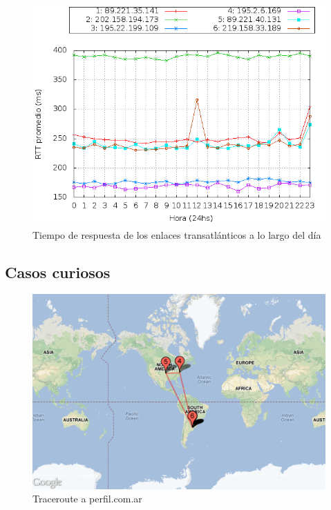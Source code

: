 \begin{figure}[H]
\begin{center}
\includegraphics[width=17cm]{rtts.png}
\end{center}
\caption{Tiempo de respuesta de los enlaces transatlánticos a lo largo del día} \label{figura1}
\end{figure}

\subsection{Casos curiosos}

\begin{figure}[H]
\begin{center}
\includegraphics[width=17cm]{perfil.png}
\end{center}
\caption{Traceroute a perfil.com.ar} \label{figura1}
\end{figure}

